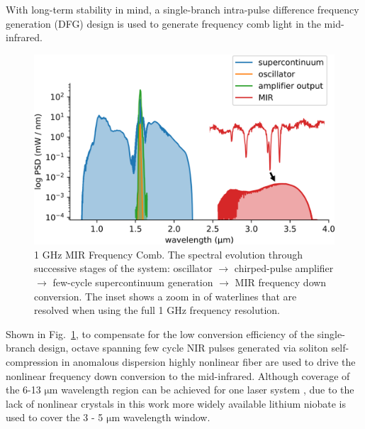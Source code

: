 \documentclass{optica-article}
\begin{document}
With long-term stability in mind, a single-branch intra-pulse difference frequency generation (DFG) design is used to generate frequency comb light in the mid-infrared. 
% 
\begin{figure}[h]
    \centering
    \includegraphics[width=\linewidth]{spectrum_in_setup.png}
    \caption{1 GHz MIR Frequency Comb. The spectral evolution through successive stages of the system: oscillator $\rightarrow$ chirped-pulse amplifier $\rightarrow$ few-cycle supercontinuum generation $\rightarrow$ MIR frequency down conversion. The inset shows a zoom in of waterlines that are resolved when using the full 1 GHz frequency resolution.}
    \label{fig:spectrum_in_setup}
\end{figure}
%
Shown in \mbox{Fig. \ref{fig:spectrum_in_setup}}, to compensate for the low conversion efficiency of the single-branch design, octave spanning few cycle NIR pulses generated via soliton self-compression in anomalous dispersion highly nonlinear fiber are used to drive the nonlinear frequency down conversion to the mid-infrared. Although coverage of the 6-13 $\mathrm{\mu m}$ wavelength region can be achieved for one laser system \cite{hoghooghiBroadband1GHzMidinfrared2022}, due to the lack of nonlinear crystals in this work more widely available lithium niobate is used to cover the 3 - 5 $\mathrm{\mu m}$ wavelength window.
\end{document}
